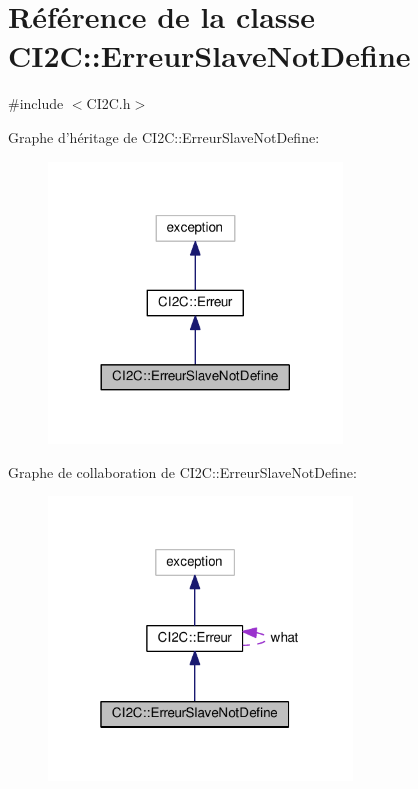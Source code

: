 \hypertarget{class_c_i2_c_1_1_erreur_slave_not_define}{\section{Référence de la classe C\+I2\+C\+:\+:Erreur\+Slave\+Not\+Define}
\label{class_c_i2_c_1_1_erreur_slave_not_define}
}


{\ttfamily \#include $<$C\+I2\+C.\+h$>$}



Graphe d'héritage de C\+I2\+C\+:\+:Erreur\+Slave\+Not\+Define\+:
\nopagebreak
\begin{figure}[H]
\begin{center}
\leavevmode
\includegraphics[width=221pt]{class_c_i2_c_1_1_erreur_slave_not_define__inherit__graph}
\end{center}
\end{figure}


Graphe de collaboration de C\+I2\+C\+:\+:Erreur\+Slave\+Not\+Define\+:
\nopagebreak
\begin{figure}[H]
\begin{center}
\leavevmode
\includegraphics[width=229pt]{class_c_i2_c_1_1_erreur_slave_not_define__coll__graph}
\end{center}
\end{figure}
